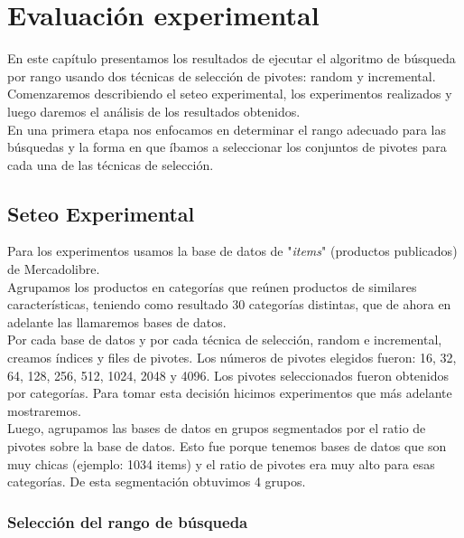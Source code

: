\chapter{Evaluaci\'on experimental}


En este cap\'itulo presentamos los resultados de ejecutar el algoritmo de b\'usqueda por rango usando dos t\'ecnicas de selecci\'on de pivotes: random y incremental.\\

Comenzaremos describiendo el seteo experimental, los experimentos realizados y luego daremos el an\'alisis de los resultados obtenidos.\\

En una primera etapa nos enfocamos en determinar el rango adecuado para las b\'usquedas y la forma en que \'ibamos a seleccionar los conjuntos de pivotes para cada una de las t\'ecnicas de selecci\'on.\\

\section{Seteo Experimental}

Para los experimentos usamos la base de datos de "\textit{items}" (productos publicados) de Mercadolibre.\\
	
Agrupamos los productos en categor\'ias que re\'unen productos de similares caracter\'isticas, teniendo como resultado 30 categor\'ias distintas, que de  ahora en adelante las llamaremos bases de datos.\\

Por cada base de datos y por cada t\'ecnica de selecci\'on, random e incremental, creamos \'indices y files de pivotes. Los n\'umeros de pivotes elegidos fueron: 16, 32, 64, 128, 256, 512, 1024, 2048 y 4096. Los pivotes seleccionados fueron obtenidos por categor\'ias. Para tomar esta decisi\'on hicimos experimentos que m\'as adelante mostraremos.\\

Luego, agrupamos las bases de datos en grupos segmentados por el ratio de pivotes sobre la base de datos. Esto fue porque tenemos bases de datos que son muy chicas (ejemplo: 1034 items) y el ratio de pivotes era muy alto para esas categor\'ias. De esta segmentaci\'on obtuvimos 4 grupos.\\


\subsection{Selecci\'on del rango de b\'usqueda}

